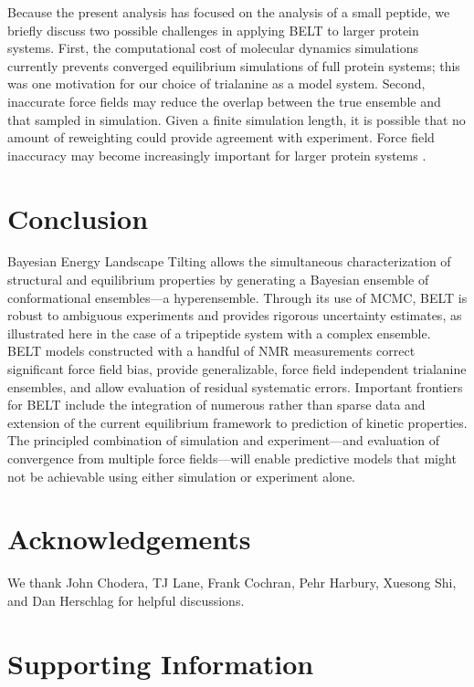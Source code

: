 \documentclass[12pt]{article}
\begin{document}
Because the present analysis has focused on the analysis of a small peptide, we briefly discuss two possible challenges in applying BELT to larger protein systems.  First, the computational cost of molecular dynamics simulations currently prevents converged equilibrium simulations of full protein systems; this was one motivation for our choice of trialanine as a model system.  Second, inaccurate force fields may reduce the overlap between the true ensemble and that sampled in simulation.  Given a finite simulation length, it is possible that no amount of reweighting could provide agreement with experiment.  Force field inaccuracy may become increasingly important for larger protein systems \cite{raval2012refinement}.


\section*{Conclusion}

Bayesian Energy Landscape Tilting allows the simultaneous characterization of structural and equilibrium properties by generating a Bayesian ensemble of conformational ensembles---a hyperensemble.  Through its use of MCMC, BELT is robust to ambiguous experiments and provides rigorous uncertainty estimates, as illustrated here in the case of a tripeptide system with a complex ensemble.  BELT models constructed with a handful of NMR measurements correct significant force field bias, provide generalizable, force field independent trialanine ensembles, and allow evaluation of residual systematic errors. Important frontiers for BELT include the integration of numerous rather than sparse data and extension of the current equilibrium framework to prediction of kinetic properties.  The principled combination of simulation and experiment---and evaluation of convergence from multiple force fields---will enable predictive models that might not be achievable using either simulation or experiment alone.  


\section*{Acknowledgements}

We thank John Chodera, TJ Lane, Frank Cochran, Pehr Harbury, Xuesong Shi, and Dan Herschlag for helpful discussions.  

\section*{Supporting Information}
\end{document}

